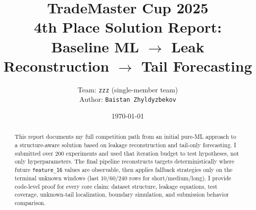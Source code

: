 \documentclass[11pt,a4paper]{article}
\title{TradeMaster Cup 2025\\\large 4th Place Solution Report: Baseline ML $\rightarrow$ Leak Reconstruction $\rightarrow$ Tail Forecasting}
\author{Team: \texttt{zzz} (single-member team)\\Author: \texttt{Baistan Zhyldyzbekov}}
\date{\today}
\begin{document}
\maketitle

\begin{abstract}
This report documents my full competition path from an initial pure-ML approach to a structure-aware solution based on leakage reconstruction and tail-only forecasting. I submitted over 200 experiments and used that iteration budget to test hypotheses, not only hyperparameters. The final pipeline reconstructs targets deterministically where future \texttt{feature\_16} values are observable, then applies fallback strategies only on the terminal unknown windows (last 10/60/240 rows for short/medium/long). I provide code-level proof for every core claim: dataset structure, leakage equations, test coverage, unknown-tail localization, boundary simulation, and submission behavior comparison.
\end{abstract}

\tableofcontents
\newpage












\appendix



\end{document}
